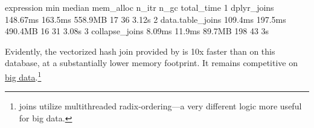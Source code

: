\documentclass[nojss]{jss} %
\begin{document}
%
\begin{Schunk}
\begin{Soutput}
        expression      min  median mem_alloc n_itr n_gc total_time
1      dplyr_joins 148.67ms 163.5ms   558.9MB    17   36      3.12s
2 data.table_joins  109.4ms 197.5ms   490.4MB    16   31      3.08s
3   collapse_joins   8.09ms  11.9ms    89.7MB   198   43         3s
\end{Soutput}
\end{Schunk}
%
Evidently, the vectorized hash join provided by  is 10x faster than  on this database, at a substantially lower memory footprint. It remains competitive on \href{https://duckdblabs.github.io/db-benchmark/}{big data}.\footnote{ joins utilize multithreaded radix-ordering---a very different logic more useful for big data.\vspace{-5mm}} \newline
\end{document}
